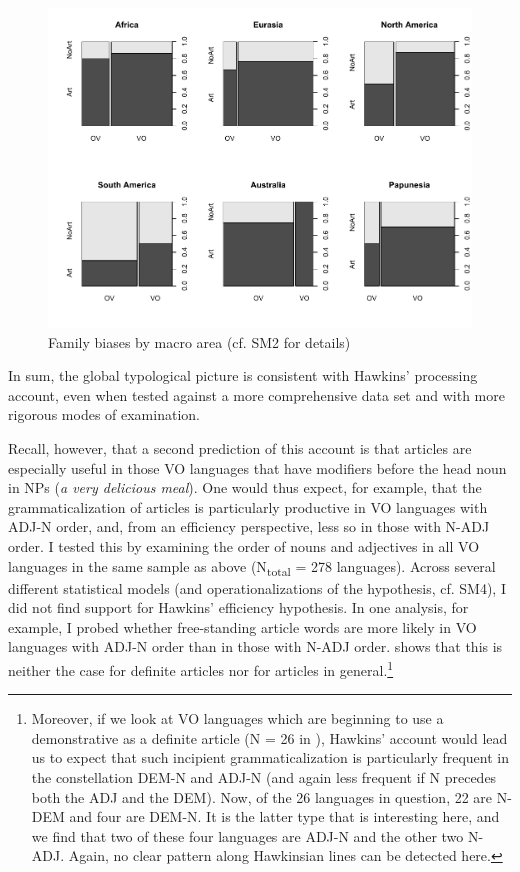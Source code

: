\documentclass[output=paper]{langsci/langscibook}
\begin{document}
 
\begin{figure}
\includegraphics[width=\textwidth]{figures/ksb3.pdf}
\caption{Family biases by macro area (cf. SM2 for details)}
\label{fig:ksb:3}
\end{figure}

In sum, the global typological picture is consistent with Hawkins’ processing account, even when tested against a more comprehensive data set and with more rigorous modes of examination. 

Recall, however, that a second prediction of this account is that articles are especially useful in those VO languages that have modifiers before the head noun in NPs (\textit{a very delicious meal}). One would thus expect, for example, that the grammaticalization of articles is particularly productive in VO languages with ADJ-N order, and, from an efficiency perspective, less so in those with N-ADJ order. I tested this by examining the order of nouns and adjectives \citep{Dryer2013c} in all VO languages in the same sample as above (N\textsubscript{total} = 278 languages). Across several different statistical models (and operationalizations of the hypothesis, cf. SM4), I did not find support for Hawkins’ efficiency hypothesis. In one analysis, for example, I probed whether free-standing article words are more likely in VO languages with ADJ-N order than in those with N-ADJ order.  shows that this is neither the case for definite articles nor for articles in general.\footnote{Moreover, if we look at VO languages which are beginning to use a demonstrative as a definite article (N = 26 in \citealt{Dryer2013a}), Hawkins’ account would lead us to expect that such incipient grammaticalization is particularly frequent in the constellation DEM-N and ADJ-N (and again less frequent if N precedes both the ADJ and the DEM). Now, of the 26 languages in question, 22 are N-DEM and four are DEM-N. It is the latter type that is interesting here, and we find that two of these four languages are ADJ-N and the other two N-ADJ. Again, no clear pattern along Hawkinsian lines can be detected here.} 
\end{document}
